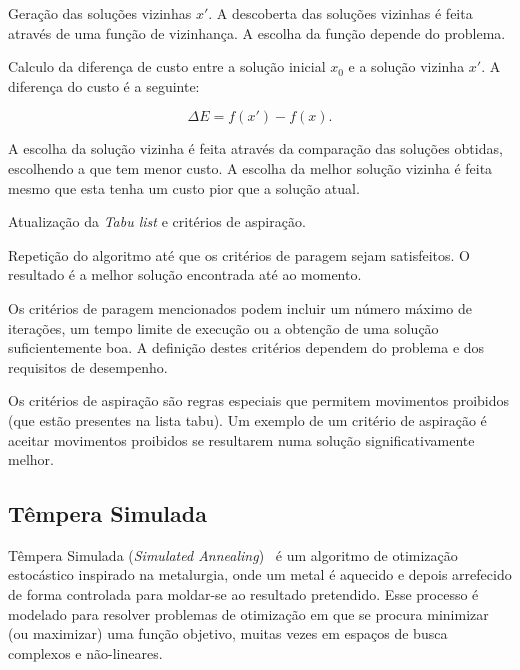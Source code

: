 \begin{compactitem}
    \item Geração das soluções vizinhas $x'$. A descoberta das soluções vizinhas é feita através de uma função de vizinhança. A escolha da função depende do problema.

    \item Calculo da diferença de custo entre a solução inicial $x_0$ e a solução vizinha $x'$. A diferença do custo é a seguinte:

    \begin{equation}
        \Delta E = f(x') - f(x).
    \end{equation}

    A escolha da solução vizinha é feita através da comparação das soluções obtidas, escolhendo a que tem menor custo. A escolha da melhor solução vizinha é feita mesmo que esta tenha um custo pior que a solução atual.

    \item Atualização da \textit{Tabu list} e critérios de aspiração.
    
    \item Repetição do algoritmo até que os critérios de paragem sejam satisfeitos. O resultado é a melhor solução encontrada até ao momento.
\end{compactitem}

Os critérios de paragem mencionados podem incluir um número máximo de iterações, um tempo limite de execução ou a obtenção de uma solução suficientemente boa. A definição destes critérios dependem do problema e dos requisitos de desempenho.

Os critérios de aspiração são regras especiais que permitem movimentos proibidos (que estão presentes na lista tabu). Um exemplo de um critério de aspiração é aceitar movimentos proibidos se resultarem numa solução significativamente melhor.

\subsection{Têmpera Simulada}
\label{explic:simulated-annealing}

Têmpera Simulada (\textit{Simulated Annealing})~\cite{MetaheuristicsDesignImplementation-Talbi-2009} é um algoritmo de otimização estocástico inspirado na metalurgia, onde um metal é aquecido e depois arrefecido de forma controlada para moldar-se ao resultado pretendido. Esse processo é modelado para resolver problemas de otimização em que se procura minimizar (ou maximizar) uma função objetivo, muitas vezes em espaços de busca complexos e não-lineares.

